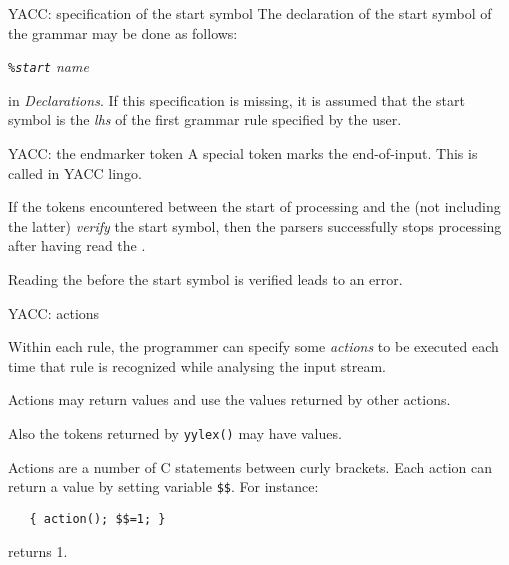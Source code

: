 \begin{frame}[fragile]{YACC: specification of the start symbol}
The declaration of the start symbol of the grammar may be done as follows:

\vspace{20pt}


\begin{center}\em
\verb"%start" name
\end{center}


\vspace{20pt}

in {\em Declarations}. If this specification is missing,
it is assumed that the start symbol is the
{\em lhs\/} of the first grammar rule specified by the user.



\end{frame}
\begin{frame}[fragile]{YACC: the endmarker token}
A special token marks the end-of-input. This is called
\endmarker{} in YACC lingo.


\vspace{20pt}

If the tokens encountered between the start of processing
and the \endmarker{} (not including the latter)
{\em verify\/} the start symbol, then
the parsers successfully stops processing after having read
the \endmarker.


\vspace{20pt}

Reading the \endmarker{} before the start symbol is verified
leads to an error.


\end{frame}
\begin{frame}[fragile]{YACC: actions}

Within each rule, the programmer can specify some \emph{actions\/}
to be executed each time that rule is recognized while analysing
the input stream.


\vspace{20pt}

Actions may return values and use the values returned by other actions.


\vspace{20pt}

Also the tokens returned by {\tt yylex()} may have values.


\vspace{20pt}

Actions are a number of C statements between curly brackets. Each
action can return a value by setting variable
\verb"$$". For instance:


\vspace{20pt}

\verb"   { action(); $$=1; }"

\vspace{20pt}

returns 1.



\end{frame}
